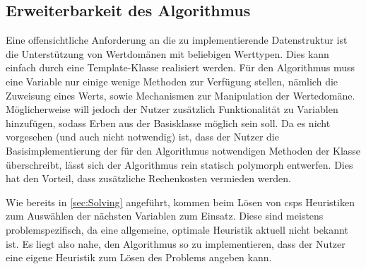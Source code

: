 \subsection{Erweiterbarkeit des Algorithmus}
\label{sec:Extensions}
Eine offensichtliche Anforderung an die zu implementierende Datenstruktur  ist die Unterstützung von Wertdomänen mit beliebigen Werttypen. Dies kann einfach durch
eine Template-Klasse realisiert werden. Für den Algorithmus muss eine Variable nur einige wenige Methoden zur Verfügung stellen, nämlich die Zuweisung eines Werts, sowie Mechanismen
zur Manipulation der Wertedomäne. Möglicherweise will jedoch der Nutzer zusätzlich Funktionalität zu Variablen hinzufügen, sodass Erben aus der Basisklasse 
möglich sein soll. Da es nicht vorgesehen (und auch nicht notwendig) ist, dass der Nutzer die Basisimplementierung der für den Algorithmus notwendigen Methoden der Klasse
 überschreibt, lässt sich der Algorithmus rein statisch polymorph entwerfen. Dies hat den Vorteil, dass zusätzliche Rechenkosten vermieden werden.

Wie bereits in \cref{sec:Solving} angeführt, kommen beim Lösen von \acp{csp} Heuristiken zum Auswählen der nächsten Variablen zum Einsatz. Diese sind meistens problemspezifisch,
da eine allgemeine, optimale Heuristik aktuell nicht bekannt ist. Es liegt also nahe, den Algorithmus so zu implementieren, dass der Nutzer eine eigene Heuristik zum Lösen des
Problems angeben kann.
